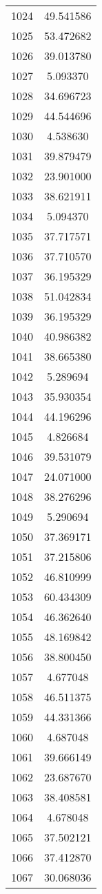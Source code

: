 \documentclass[12pt]{article}
\begin{document}
\begin{longtable}{@{}cc@{}}
1024 & 49.541586 \\
1025 & 53.472682 \\
1026 & 39.013780 \\
1027 & 5.093370 \\
1028 & 34.696723 \\
1029 & 44.544696 \\
1030 & 4.538630 \\
1031 & 39.879479 \\
1032 & 23.901000 \\
1033 & 38.621911 \\
1034 & 5.094370 \\
1035 & 37.717571 \\
1036 & 37.710570 \\
1037 & 36.195329 \\
1038 & 51.042834 \\
1039 & 36.195329 \\
1040 & 40.986382 \\
1041 & 38.665380 \\
1042 & 5.289694 \\
1043 & 35.930354 \\
1044 & 44.196296 \\
1045 & 4.826684 \\
1046 & 39.531079 \\
1047 & 24.071000 \\
1048 & 38.276296 \\
1049 & 5.290694 \\
1050 & 37.369171 \\
1051 & 37.215806 \\
1052 & 46.810999 \\
1053 & 60.434309 \\
1054 & 46.362640 \\
1055 & 48.169842 \\
1056 & 38.800450 \\
1057 & 4.677048 \\
1058 & 46.511375 \\
1059 & 44.331366 \\
1060 & 4.687048 \\
1061 & 39.666149 \\
1062 & 23.687670 \\
1063 & 38.408581 \\
1064 & 4.678048 \\
1065 & 37.502121 \\
1066 & 37.412870 \\
1067 & 30.068036 \\

\end{longtable}
\end{document}
